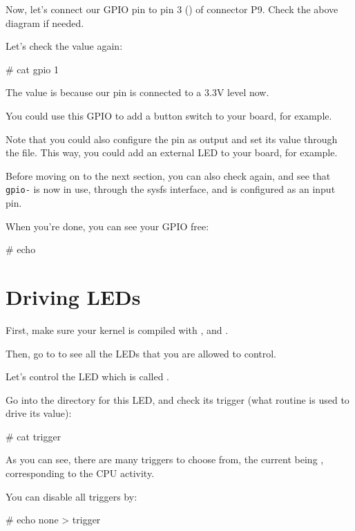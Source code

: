 {Now, let's connect our GPIO pin to pin 3 () of connector P9. Check the above diagram if needed.

Let's check the value again:

\begin{bashinput}
# cat gpio%
1
\end{bashinput}

The value is  because our pin is connected to a 3.3V level now.

You could use this GPIO to add a button switch to your board, for
example.

Note that you could also configure the pin as output and set its value
through the  file. This way, you could add an external LED
to your board, for example.

Before moving on to the next section, you can also check
 again, and see that {\tt gpio-\gpionum} is now
in use, through the sysfs interface, and is configured as an input pin.

When you're done, you can see your GPIO free:

\begin{bashinput}
# echo %
\end{bashinput}

\section{Driving LEDs}

First, make sure your kernel is compiled with
, 
and .

Then, go to  to see all the LEDs that you are allowed
to control.

Let's control the LED which is called
.

Go into the directory for this LED, and check its trigger (what
routine is used to drive its value):

\begin{bashinput}
# cat trigger
\end{bashinput}

As you can see, there are many triggers to choose from, the current
being , corresponding to the CPU activity.

You can disable all triggers by:

\begin{bashinput}
# echo none > trigger
\end{bashinput}

}

